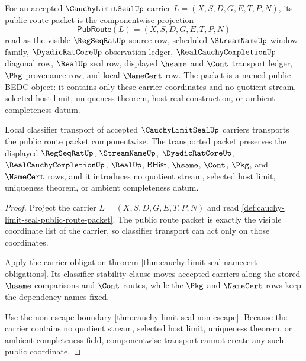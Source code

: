 \begin{definition}
\label{def:cauchy-limit-seal-public-route-packet}
For an accepted $\CauchyLimitSealUp$ carrier $L=(X,S,D,G,E,T,P,N)$, its public route packet is the componentwise projection
$$
\mathsf{PubRoute}(L)=(X,S,D,G,E,T,P,N)
$$
read as the visible $\RegSeqRatUp$ source row, scheduled $\StreamNameUp$ window family, $\DyadicRatCoreUp$ observation ledger, $\RealCauchyCompletionUp$ diagonal row, $\RealUp$ seal row, displayed $\hsame$ and $\Cont$ transport ledger, $\Pkg$ provenance row, and local $\NameCert$ row. The packet is a named public BEDC object: it contains only these carrier coordinates and no quotient stream, selected host limit, uniqueness theorem, host real construction, or ambient completeness datum.
\end{definition}

\begin{theorem}
\label{thm:cauchy-limit-seal-public-route-transport}
Local classifier transport of accepted $\CauchyLimitSealUp$ carriers transports the public route packet componentwise. The transported packet preserves the displayed $\RegSeqRatUp$, $\StreamNameUp$, $\DyadicRatCoreUp$, $\RealCauchyCompletionUp$, $\RealUp$, $\mathsf{BHist}$, $\hsame$, $\Cont$, $\Pkg$, and $\NameCert$ rows, and it introduces no quotient stream, selected host limit, uniqueness theorem, or ambient completeness datum.
\end{theorem}
\begin{proof}
Project the carrier $L=(X,S,D,G,E,T,P,N)$ and read \autoref{def:cauchy-limit-seal-public-route-packet}. The public route packet is exactly the visible coordinate list of the carrier, so classifier transport can act only on those coordinates.

Apply the carrier obligation theorem \autoref{thm:cauchy-limit-seal-namecert-obligations}. Its classifier-stability clause moves accepted carriers along the stored $\hsame$ comparisons and $\Cont$ routes, while the $\Pkg$ and $\NameCert$ rows keep the dependency names fixed.

Use the non-escape boundary \autoref{thm:cauchy-limit-seal-non-escape}. Because the carrier contains no quotient stream, selected host limit, uniqueness theorem, or ambient completeness field, componentwise transport cannot create any such public coordinate.
\end{proof}

